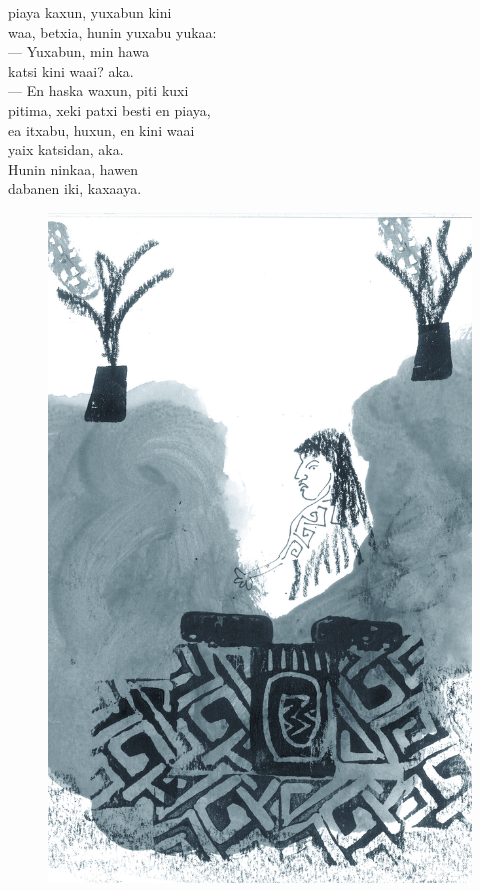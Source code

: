  piaya kaxun, yuxabun kini\\
waa, betxia, hunin yuxabu yukaa:\\
--- Yuxabun, min hawa\\
katsi kini waai? aka.\\
--- En haska waxun, piti kuxi\\
pitima, xeki patxi besti en piaya,\\
ea itxabu, huxun, en kini waai\\
yaix katsidan, aka.\\
Hunin ninkaa, hawen\\
dabanen iki, kaxaaya.

\vspace*{\fill}

\pagebreak
\thispagestyle{empty}
\begin{figure}
\vspace*{-1.6cm}
\hspace*{-2.2cm}\includegraphics[width=138mm]{./imgs/img8.jpg}
\end{figure}

